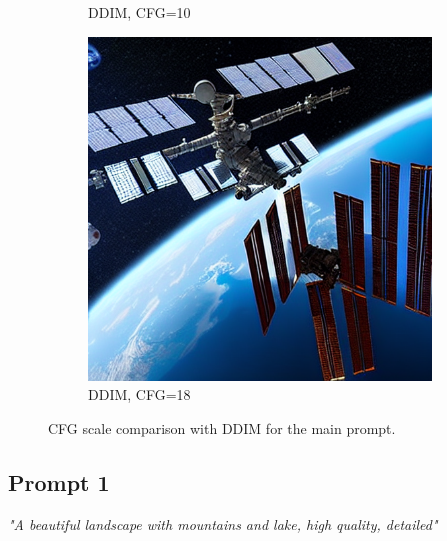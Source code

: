 \documentclass[10pt,twocolumn]{article}
\begin{document}
\begin{figure}[H]
\begin{subfigure}{0.32\textwidth}
        \caption{DDIM, CFG=10}
    \end{subfigure}
    \begin{subfigure}{0.32\textwidth}
        \includegraphics[width=\linewidth]{figures/baseline_ddim_cfg18.0_512_prompt10_20250712_113616.png}
        \caption{DDIM, CFG=18}
    \end{subfigure}
    \caption{CFG scale comparison with DDIM for the main prompt.}
\end{figure}

\subsection*{Prompt 1}
\noindent\textit{"A beautiful landscape with mountains and lake, high quality, detailed"}
\end{document}
